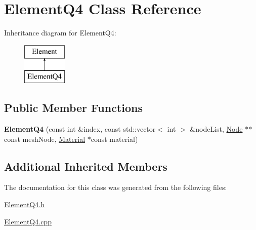\hypertarget{class_element_q4}{}\section{Element\+Q4 Class Reference}
\label{class_element_q4}
Inheritance diagram for Element\+Q4\+:\begin{figure}[H]
\begin{center}
\leavevmode
\includegraphics[height=2.000000cm]{class_element_q4}
\end{center}
\end{figure}
\subsection*{Public Member Functions}
\begin{DoxyCompactItemize}
\item 
\mbox{\label{class_element_q4_a0b8d522dd7264ba693d95b3a01960319}} 
{\bfseries Element\+Q4} (const int \&index, const std\+::vector$<$ int $>$ \&node\+List, \mbox{\hyperlink{class_node}{Node}} $\ast$$\ast$const mesh\+Node, \mbox{\hyperlink{class_material}{Material}} $\ast$const material)
\end{DoxyCompactItemize}
\subsection*{Additional Inherited Members}


The documentation for this class was generated from the following files\+:\begin{DoxyCompactItemize}
\item 
\mbox{\hyperlink{_element_q4_8h}{Element\+Q4.\+h}}\item 
\mbox{\hyperlink{_element_q4_8cpp}{Element\+Q4.\+cpp}}\end{DoxyCompactItemize}
